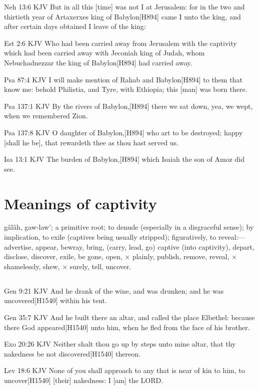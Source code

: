 \documentclass{book}
\begin{document}
Neh 13:6 KJV
But in all this [time] was not I at Jerusalem: for in the two and thirtieth year of Artaxerxes king of Babylon[H894] came I unto the king, and after certain days obtained I leave of the king:

Est 2:6 KJV
Who had been carried away from Jerusalem with the captivity which had been carried away with Jeconiah king of Judah, whom Nebuchadnezzar the king of Babylon[H894] had carried away.

Psa 87:4 KJV
I will make mention of Rahab and Babylon[H894] to them that know me: behold Philistia, and Tyre, with Ethiopia; this [man] was born there.

Psa 137:1 KJV
By the rivers of Babylon,[H894] there we sat down, yea, we wept, when we remembered Zion.

Psa 137:8 KJV
O daughter of Babylon,[H894] who art to be destroyed; happy [shall he be], that rewardeth thee as thou hast served us.

Isa 13:1 KJV
The burden of Babylon,[H894] which Isaiah the son of Amoz did see.

\chapter{Meanings of captivity}

gâlâh, gaw-law'; a primitive root; to denude (especially in a disgraceful sense); by implication, to exile (captives being usually stripped); figuratively, to reveal:— advertise, appear, bewray, bring, (carry, lead, go) captive (into captivity), depart, disclose, discover, exile, be gone, open, × plainly, publish, remove, reveal, × shamelessly, shew, × surely, tell, uncover.

\section{}

Gen 9:21 KJV
And he drank of the wine, and was drunken; and he was uncovered[H1540] within his tent.

Gen 35:7 KJV
And he built there an altar, and called the place Elbethel: because there God appeared[H1540] unto him, when he fled from the face of his brother.

Exo 20:26 KJV
Neither shalt thou go up by steps unto mine altar, that thy nakedness be not discovered[H1540] thereon.

Lev 18:6 KJV
None of you shall approach to any that is near of kin to him, to uncover[H1540] [their] nakedness: I [am] the LORD.
\end{document}
